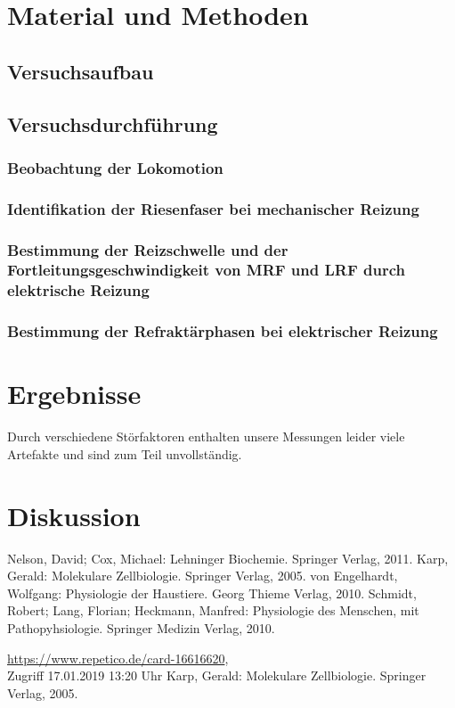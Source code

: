 \documentclass[11pt]{article}
\begin{document}
\section{Material und Methoden}


\subsection{Versuchsaufbau}


\subsection{Versuchsdurchführung}
\subsubsection{Beobachtung der Lokomotion}

\subsubsection{Identifikation der Riesenfaser bei mechanischer Reizung}

\subsubsection{Bestimmung der Reizschwelle und der Fortleitungsgeschwindigkeit von MRF und LRF durch elektrische Reizung}

\subsubsection{Bestimmung der Refraktärphasen bei elektrischer Reizung}

\section{Ergebnisse}
Durch verschiedene Störfaktoren enthalten unsere Messungen leider viele Artefakte und sind zum Teil unvollständig. 


\section{Diskussion}

\begin{thebibliography}{999}
 Nelson, David; Cox, Michael: Lehninger Biochemie. Springer Verlag, 2011.
 Karp, Gerald: Molekulare Zellbiologie. Springer Verlag, 2005.
 von Engelhardt, Wolfgang: Physiologie der Haustiere. Georg Thieme Verlag, 2010. 
 Schmidt, Robert; Lang, Florian; Heckmann, Manfred: Physiologie des Menschen, mit Pathopyhsiologie. Springer Medizin Verlag, 2010. 

 \url{https://www.repetico.de/card-16616620}, \\Zugriff 17.01.2019 13:20 Uhr
 Karp, Gerald: Molekulare Zellbiologie. Springer Verlag, 2005.
\end{thebibliography}
\end{document}
